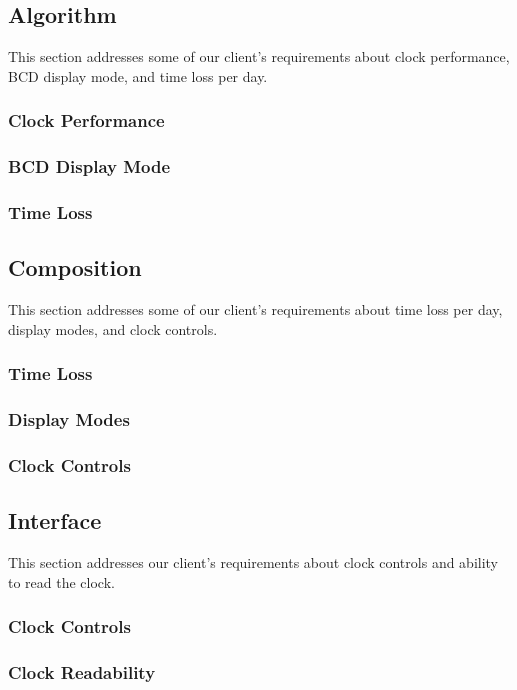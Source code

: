 \documentclass[10pt,draftclsnofoot,onecolumn]{IEEEtran}
\begin{document}
\subsection{Algorithm}
This section addresses some of our client's requirements about clock performance, BCD display mode, and time loss per day.

\subsubsection{Clock Performance}

\subsubsection{BCD Display Mode}

\subsubsection{Time Loss}

\subsection{Composition}
This section addresses some of our client's requirements about time loss per day, display modes, and clock controls. 

\subsubsection{Time Loss}

\subsubsection{Display Modes}

\subsubsection{Clock Controls}

\subsection{Interface} 
This section addresses our client's requirements about clock controls and ability to read the clock. 

\subsubsection{Clock Controls}

\subsubsection{Clock Readability}
\end{document}

